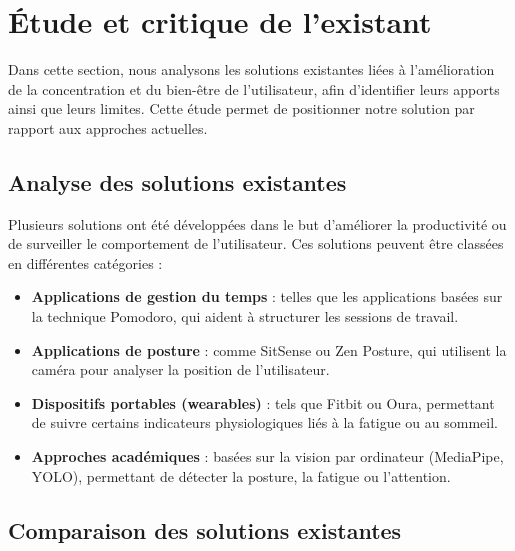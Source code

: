 \documentclass[12pt,a4paper]{report}
\begin{document}
\section{Étude et critique de l'existant}
Dans cette section, nous analysons les solutions existantes liées à l'amélioration de la concentration et du bien-être de l'utilisateur, afin d'identifier leurs apports ainsi que leurs limites. Cette étude permet de positionner notre solution par rapport aux approches actuelles.

\subsection{Analyse des solutions existantes}
Plusieurs solutions ont été développées dans le but d'améliorer la productivité ou de surveiller le comportement de l'utilisateur. Ces solutions peuvent être classées en différentes catégories :

\begin{itemize}
    \item \textbf{Applications de gestion du temps} : telles que les applications basées sur la technique Pomodoro, qui aident à structurer les sessions de travail.
    \item \textbf{Applications de posture} : comme SitSense ou Zen Posture, qui utilisent la caméra pour analyser la position de l'utilisateur.
    \item \textbf{Dispositifs portables (wearables)} : tels que Fitbit ou Oura, permettant de suivre certains indicateurs physiologiques liés à la fatigue ou au sommeil.
    \item \textbf{Approches académiques} : basées sur la vision par ordinateur (MediaPipe, YOLO), permettant de détecter la posture, la fatigue ou l'attention.
\end{itemize}

\subsection{Comparaison des solutions existantes}
\end{document}
